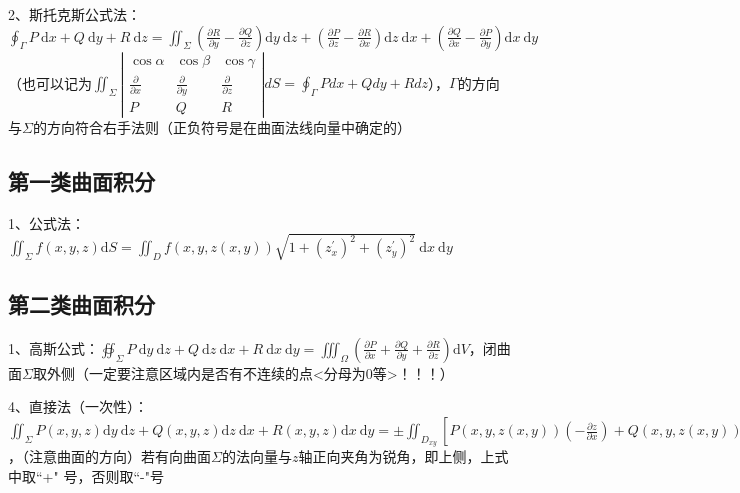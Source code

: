 2、斯托克斯公式法：$\oint_{\Gamma} P \mathrm{~d} x+Q \mathrm{~d} y+R \mathrm{~d} z=\iint_{\Sigma}\left(\frac{\partial R}{\partial y}-\frac{\partial Q}{\partial z}\right) \mathrm{d} y \mathrm{~d} z+\left(\frac{\partial P}{\partial z}-\frac{\partial R}{\partial x}\right) \mathrm{d} z \mathrm{~d} x+\left(\frac{\partial Q}{\partial x}-\frac{\partial P}{\partial y}\right) \mathrm{d} x \mathrm{~d} y$（也可以记为$\iint_{\Sigma}\left|\begin{array}{ccc}\cos \alpha & \cos \beta & \cos \gamma \\\frac{\partial}{\partial x} & \frac{\partial}{\partial y} & \frac{\partial}{\partial z} \\P & Q & R\end{array}\right| d S=\oint_{\Gamma} P d x+Q d y+R d z$），$\Gamma$的方向与$\Sigma$的方向符合右手法则（正负符号是在曲面法线向量中确定的）



\subsection{第一类曲面积分}

1、公式法：$\iint_{\Sigma} f(x, y, z) \mathrm{d} S=\iint_{D} f(x, y, z(x, y)) \sqrt{1+\left(z_{x}^{\prime}\right)^{2}+\left(z_{y}^{\prime}\right)^{2}} \mathrm{~d} x \mathrm{~d} y$



\subsection{第二类曲面积分}

1、高斯公式：$\oiint_{\Sigma} P \mathrm{~d} y \mathrm{~d} z+Q \mathrm{~d} z \mathrm{~d} x+R \mathrm{~d} x \mathrm{~d} y=\iiint_{\Omega}\left(\frac{\partial P}{\partial x}+\frac{\partial Q}{\partial y}+\frac{\partial R}{\partial z}\right) \mathrm{d} V$，闭曲面$\Sigma$取外侧（一定要注意区域内是否有不连续的点<分母为0等>！！！）

4、直接法（一次性）：$\iint_{\Sigma} P(x, y, z) \mathrm{d} y \mathrm{~d} z+Q(x, y, z) \mathrm{d} z \mathrm{~d} x+R(x, y, z) \mathrm{d} x \mathrm{~d} y = \pm \iint_{D_{x y}}[P(x, y, z(x, y))\left(-\frac{\partial z}{\partial x}\right)+Q(x, y, z(x, y))\left(-\frac{\partial z}{\partial y}\right)+R(x, y, z(x, y))] \mathrm{d} x \mathrm{~d} y$，（注意曲面的方向）若有向曲面$\Sigma$的法向量与$z$轴正向夹角为锐角，即上侧，上式中取“+" 号，否则取“-"号


